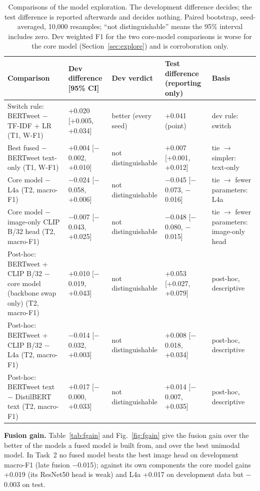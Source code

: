 \documentclass[conference]{IEEEtran}
\begin{document}
\begin{table}[t]
\centering
\caption{Comparisons of the model exploration. The development difference decides; the test difference is reported afterwards and decides nothing. Paired bootstrap, seed-averaged, 10,000 resamples; ``not distinguishable'' means the 95\% interval includes zero. Dev weighted F1 for the two core-model comparisons is worse for the core model (Section~\ref{sec:explore}) and is corroboration only.}
\label{tab:prereg}
\footnotesize
\setlength{\tabcolsep}{4pt}
\begin{tabular}{p{5.6cm}p{3.3cm}p{2.3cm}p{3.2cm}p{3.0cm}}
\toprule
Comparison & Dev difference [95\% CI] & Dev verdict & Test difference (reporting only) & Basis \\
\midrule
Switch rule: BERTweet $-$ TF-IDF + LR (T1, W-F1) & +0.020 [+0.005, +0.034] & better (every seed) & +0.041 (point) & dev rule: switch \\
Best fused $-$ BERTweet text-only (T1, W-F1) & +0.004 [$-$0.002, +0.010] & not distinguishable & +0.007 [+0.001, +0.012] & tie $\rightarrow$ simpler: text-only \\
Core model $-$ L4a (T2, macro-F1) & $-$0.024 [$-$0.058, +0.006] & not distinguishable & $-$0.045 [$-$0.073, $-$0.016] & tie $\rightarrow$ fewer parameters: L4a \\
Core model $-$ image-only CLIP B/32 head (T2, macro-F1) & $-$0.007 [$-$0.043, +0.025] & not distinguishable & $-$0.048 [$-$0.080, $-$0.015] & tie $\rightarrow$ fewer parameters: image-only head \\
Post-hoc: BERTweet + CLIP B/32 $-$ core model (backbone swap only) (T2, macro-F1) & +0.010 [$-$0.019, +0.043] & not distinguishable & +0.053 [+0.027, +0.079] & post-hoc, descriptive \\
Post-hoc: BERTweet + CLIP B/32 $-$ L4a (T2, macro-F1) & $-$0.014 [$-$0.032, +0.003] & not distinguishable & +0.008 [$-$0.018, +0.034] & post-hoc, descriptive \\
Post-hoc: BERTweet text $-$ DistilBERT text (T2, macro-F1) & +0.017 [$-$0.000, +0.033] & not distinguishable & +0.014 [$-$0.007, +0.035] & post-hoc, descriptive \\
\bottomrule
\end{tabular}
\end{table}

\textbf{Fusion gain.} Table~\ref{tab:fgain} and Fig.~\ref{fig:fgain} give the fusion gain over the better of the models a fused model is built from, and over the best unimodal model. In Task~2 no fused model beats the best image head on development macro-F1 (late fusion $-$0.015); against its own components the core model gains +0.019 (its ResNet50 head is weak)
and L4a +0.017 on development data but $-$0.003 on test.
\end{document}
